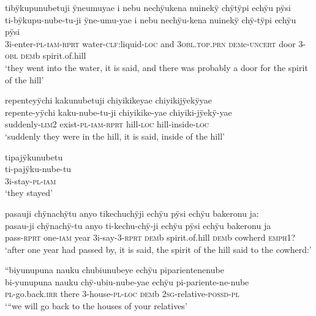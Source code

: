 \ea%
\begingl 
\glpreamble tibÿkupunubetuji ÿneumuyae i nebu nechÿukena nuinekÿ chÿtÿpi echÿu pÿsi\\
\gla ti-bÿkupu-nube-tu-ji ÿne-umu-yae i nebu nechÿu-kena nuinekÿ chÿ-tÿpi echÿu pÿsi\\ 
\glb 3i-enter-\textsc{pl}-\textsc{iam}-\textsc{rprt} water-\textsc{clf:}liquid-\textsc{loc} and 3\textsc{obl.top.prn} \textsc{dem}c-\textsc{uncert} door 3-\textsc{obl} \textsc{dem}b spirit.of.hill\\ 
\glft ‘they went into the water, it is said, and there was probably a door for the spirit of the hill’\\ 
\endgl
\xe

\ea%
\begingl 
\glpreamble repenteyÿchi kakunubetuji chiyikikeyae chiyikijÿekÿyae\\
\gla repente-yÿchi kaku-nube-tu-ji chiyikike-yae chiyiki-jÿekÿ-yae\\ 
\glb suddenly-\textsc{lim}2 exist-\textsc{pl}-\textsc{iam}-\textsc{rprt} hill-\textsc{loc} hill-inside-\textsc{loc}\\ 
\glft ‘suddenly they were in the hill, it is said, inside of the hill’\\ 
\endgl
\xe

\ea%
\begingl 
\glpreamble tipajÿkunubetu\\
\gla ti-pajÿku-nube-tu\\ 
\glb 3i-stay-\textsc{pl}-\textsc{iam}\\ 
\glft ‘they stayed’\\ 
\endgl
\xe

\ea%
\begingl 
\glpreamble pasauji chÿnachÿtu anyo tikechuchÿji echÿu pÿsi echÿu bakeronu ja:\\
\gla pasau-ji chÿnachÿ-tu anyo ti-kechu-chÿ-ji echÿu pÿsi echÿu bakeronu ja\\ 
\glb pass-\textsc{rprt} one-\textsc{iam} year 3i-say-3-\textsc{rprt} \textsc{dem}b spirit.of.hill \textsc{dem}b cowherd \textsc{emph}1?\\ 
\glft ‘after one year had passed by, it is said, the spirit of the hill said to the cowherd:’\\ 
\endgl
\xe

\ea%
\begingl 
\glpreamble “biyunupuna nauku chubiunubeye echÿu piparientenenube\\
\gla bi-yunupuna nauku chÿ-ubiu-nube-yae echÿu pi-pariente-ne-nube\\ 
\textsc{pl}-go.back.\textsc{irr} there 3-house-\textsc{pl}-\textsc{loc} \textsc{dem}b 2\textsc{sg}-relative-\textsc{possd}-\textsc{pl}\\ 
\glft ‘“we will go back to the houses of your relatives’\\ 
\endgl
\xe

